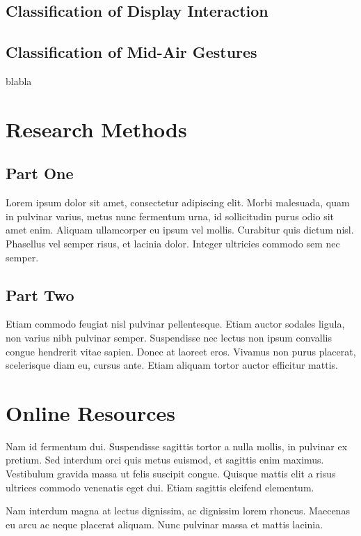 \documentclass[sigchi]{acmart}
\begin{document}
\subsection{Classification of Display Interaction}
\subsection{Classification of Mid-Air Gestures}
blabla








\appendix

\section{Research Methods}

\subsection{Part One}

Lorem ipsum dolor sit amet, consectetur adipiscing elit. Morbi
malesuada, quam in pulvinar varius, metus nunc fermentum urna, id
sollicitudin purus odio sit amet enim. Aliquam ullamcorper eu ipsum
vel mollis. Curabitur quis dictum nisl. Phasellus vel semper risus, et
lacinia dolor. Integer ultricies commodo sem nec semper.

\subsection{Part Two}

Etiam commodo feugiat nisl pulvinar pellentesque. Etiam auctor sodales
ligula, non varius nibh pulvinar semper. Suspendisse nec lectus non
ipsum convallis congue hendrerit vitae sapien. Donec at laoreet
eros. Vivamus non purus placerat, scelerisque diam eu, cursus
ante. Etiam aliquam tortor auctor efficitur mattis.

\section{Online Resources}

Nam id fermentum dui. Suspendisse sagittis tortor a nulla mollis, in
pulvinar ex pretium. Sed interdum orci quis metus euismod, et sagittis
enim maximus. Vestibulum gravida massa ut felis suscipit
congue. Quisque mattis elit a risus ultrices commodo venenatis eget
dui. Etiam sagittis eleifend elementum.

Nam interdum magna at lectus dignissim, ac dignissim lorem
rhoncus. Maecenas eu arcu ac neque placerat aliquam. Nunc pulvinar
massa et mattis lacinia.
\end{document}
